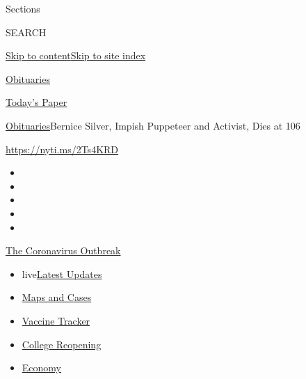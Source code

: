 Sections

SEARCH

\protect\hyperlink{site-content}{Skip to
content}\protect\hyperlink{site-index}{Skip to site index}

\href{https://www.nytimes3xbfgragh.onion/section/obituaries}{Obituaries}

\href{https://myaccount.nytimes3xbfgragh.onion/auth/login?response_type=cookie\&client_id=vi}{}

\href{https://www.nytimes3xbfgragh.onion/section/todayspaper}{Today's
Paper}

\href{/section/obituaries}{Obituaries}\textbar{}Bernice Silver, Impish
Puppeteer and Activist, Dies at 106

\url{https://nyti.ms/2Ts4KRD}

\begin{itemize}
\item
\item
\item
\item
\item
\end{itemize}

\href{https://www.nytimes3xbfgragh.onion/news-event/coronavirus?action=click\&pgtype=Article\&state=default\&region=TOP_BANNER\&context=storylines_menu}{The
Coronavirus Outbreak}

\begin{itemize}
\tightlist
\item
  live\href{https://www.nytimes3xbfgragh.onion/2020/08/04/world/coronavirus-covid-19.html?action=click\&pgtype=Article\&state=default\&region=TOP_BANNER\&context=storylines_menu}{Latest
  Updates}
\item
  \href{https://www.nytimes3xbfgragh.onion/interactive/2020/us/coronavirus-us-cases.html?action=click\&pgtype=Article\&state=default\&region=TOP_BANNER\&context=storylines_menu}{Maps
  and Cases}
\item
  \href{https://www.nytimes3xbfgragh.onion/interactive/2020/science/coronavirus-vaccine-tracker.html?action=click\&pgtype=Article\&state=default\&region=TOP_BANNER\&context=storylines_menu}{Vaccine
  Tracker}
\item
  \href{https://www.nytimes3xbfgragh.onion/2020/08/02/us/covid-college-reopening.html?action=click\&pgtype=Article\&state=default\&region=TOP_BANNER\&context=storylines_menu}{College
  Reopening}
\item
  \href{https://www.nytimes3xbfgragh.onion/live/2020/08/03/business/stock-market-today-coronavirus?action=click\&pgtype=Article\&state=default\&region=TOP_BANNER\&context=storylines_menu}{Economy}
\end{itemize}

